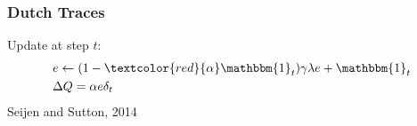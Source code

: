 \documentclass{beamer}
\begin{document}
\begin{frame}
\frametitle{Dutch Traces}
Update at step $t$:
\begin{align*}
& e \gets (1-\textcolor{red}{\alpha}\mathbbm{1}_t)\gamma\lambda e + \mathbbm{1}_t
\\
& \Delta Q = \alpha e\delta_t
\end{align*}
Seijen and Sutton, 2014 \cite{seijen2014true}
\end{frame}


\end{document}
